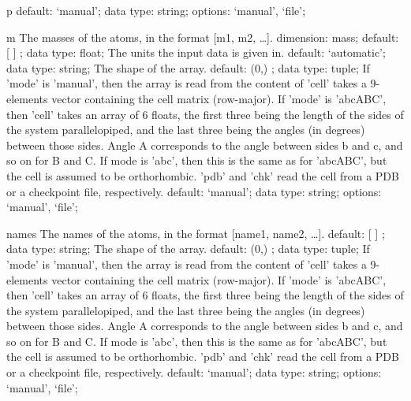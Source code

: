 \begin{ipifield}{}
\begin{ipifield}{p}
{{default: `manual'; data type: string; options: `manual', `file'; }%
}
\end{ipifield}
\begin{ipifield}{m}%
{The masses of the atoms, in the format [m1, m2, \ldots  ].}%
{dimension: mass; default:  [ ] ; data type: float; }%
{%
{The units the input data is given in.}%
{default: `automatic'; data type: string; }%
%
{The shape of the array.}%
{default:  (0,) ; data type: tuple; }%
%
{If 'mode' is 'manual', then the array is read from the content of 'cell' takes a 9-elements vector containing the cell matrix (row-major). If 'mode' is 'abcABC', then 'cell' takes an array of 6 floats, the first three being the length of the sides of the system parallelopiped, and the last three being the angles (in degrees) between those sides. Angle A corresponds to the angle between sides b and c, and so on for B and C. If mode is 'abc', then this is the same as for 'abcABC', but the cell is assumed to be orthorhombic. 'pdb' and 'chk' read the cell from a PDB or a checkpoint file, respectively.}%
{default: `manual'; data type: string; options: `manual', `file'; }%
}
\end{ipifield}
\begin{ipifield}{names}%
{The names of the atoms, in the format [name1, name2, \ldots  ].}%
{default:  [ ] ; data type: string; }%
{%
{The shape of the array.}%
{default:  (0,) ; data type: tuple; }%
%
{If 'mode' is 'manual', then the array is read from the content of 'cell' takes a 9-elements vector containing the cell matrix (row-major). If 'mode' is 'abcABC', then 'cell' takes an array of 6 floats, the first three being the length of the sides of the system parallelopiped, and the last three being the angles (in degrees) between those sides. Angle A corresponds to the angle between sides b and c, and so on for B and C. If mode is 'abc', then this is the same as for 'abcABC', but the cell is assumed to be orthorhombic. 'pdb' and 'chk' read the cell from a PDB or a checkpoint file, respectively.}%
{default: `manual'; data type: string; options: `manual', `file'; }%
}
\end{ipifield}
\end{ipifield}
